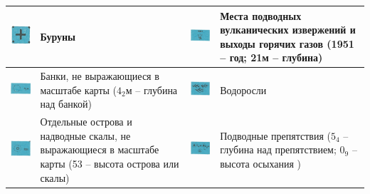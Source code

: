 \documentclass[a4paper, 12pt, twoside, final, book, russian, fittopage, cyremdash]{ncc}
\begin{document}
\begin{longtable}{M|m{0.2\textwidth}|M|m{0.2\textwidth}}
  \midrule
  \includegraphics[scale=1.3]{APP-2-A-4} & Буруны &
  \includegraphics[scale=1.3]{APP-2-A-12} & Места подводных вулканических извержений и выходы горячих газов (1951 \--- год; 21м \--- глубина) \\
  \midrule
  \includegraphics[scale=1.3]{APP-2-A-5} & Банки, не выражающиеся в масштабе карты ($4_2$м \--- глубина над банкой) &
  \includegraphics[scale=1.3]{APP-2-A-13} & Водоросли \\
  \midrule
  \includegraphics[scale=1.3]{APP-2-A-6} &  Отдельные острова и надводные скалы, не выражающиеся в масштабе карты (53 \--- высота острова или скалы) &
  \includegraphics[scale=1.3]{APP-2-A-14} & Подводные препятствия ($5_4$ \--- глубина над препятствием; $0_9$ \--- высота осыхания ) \\
  \midrule

\end{longtable}
\end{document}
